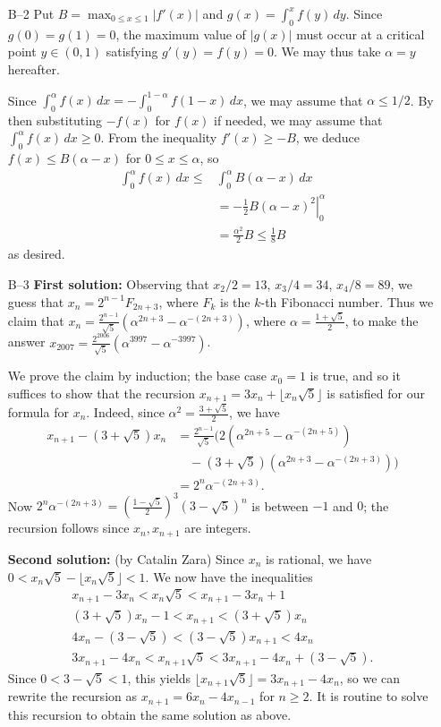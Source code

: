 \documentclass[amssymb,twocolumn,pra,10pt,aps]{revtex4-1}
\begin{document}
\begin{itemize}
\item[B--2]
Put $B = \max_{0 \leq x \leq 1} |f'(x)|$
and $g(x) = \int_0^x f(y)\,dy$. Since $g(0) = g(1) = 0$, the maximum value
of $|g(x)|$ must occur at a critical point $y \in (0,1)$ satisfying
$g'(y) = f(y) = 0$. We may thus take $\alpha = y$ hereafter.

Since $\int_0^\alpha f(x)\,dx = -\int_0^{1-\alpha} f(1-x)\,dx$,
we may assume that $\alpha \leq 1/2$. By then substituting $-f(x)$
for $f(x)$ if needed, we may assume that $\int_0^\alpha f(x)\,dx \geq 0$.
{}From the inequality $f'(x) \geq -B$, we deduce
$f(x) \leq B(\alpha - x)$ for $0 \leq x \leq \alpha$, so
\begin{align*}
\int_0^\alpha f(x)\,dx \leq &\int_0^\alpha B(\alpha-x)\,dx \\
&= -\left. \frac{1}{2} B (\alpha - x)^2 \right|_0^\alpha \\
&= \frac{\alpha^2}{2} B \leq \frac{1}{8} B
\end{align*}
as desired.

\item[B--3]
\textbf{First solution:}
Observing that $x_2/2 = 13$, $x_3/4=34$, $x_4/8=89$, we
guess that $x_n = 2^{n-1} F_{2n+3}$, where $F_k$ is the $k$-th
Fibonacci number. Thus we claim that $x_n = \frac{2^{n-1}}{\sqrt{5}}
(\alpha^{2n+3}-\alpha^{-(2n+3)})$, where $\alpha =
\frac{1+\sqrt{5}}{2}$, to make the answer $x_{2007} =
\frac{2^{2006}}{\sqrt{5}}(\alpha^{3997}-\alpha^{-3997})$.

We prove the claim by induction; the base case $x_0 = 1$ is true, and
so it suffices to show that the recursion $x_{n+1} = 3x_n + \lfloor
x_n \sqrt{5} \rfloor$ is satisfied for our formula for $x_n$. Indeed,
since $\alpha^2 = \frac{3+\sqrt{5}}{2}$, we have
\begin{align*}
x_{n+1}-(3+\sqrt{5})x_n &= \frac{2^{n-1}}{\sqrt{5}}
(2(\alpha^{2n+5}-\alpha^{-(2n+5)}) \\
&\quad-(3+\sqrt{5})(\alpha^{2n+3}-\alpha^{-(2n+3)})) \\
&= 2^n \alpha^{-(2n+3)}.
\end{align*}
Now $2^n \alpha^{-(2n+3)} =
(\frac{1-\sqrt{5}}{2})^3 (3-\sqrt{5})^n$ is between $-1$ and $0$; the
recursion follows since $x_n,x_{n+1}$ are integers.

\textbf{Second solution:}
(by Catalin Zara)
Since $x_n$ is rational, we have $0 < x_n \sqrt{5} - \lfloor x_n \sqrt{5}
\rfloor < 1$. We now have the inequalities
\begin{gather*}
x_{n+1}-3x_n < x_n \sqrt{5} < x_{n+1} -3x_n+1 \\
(3+\sqrt{5})x_n - 1 < x_{n+1} < (3+\sqrt{5})x_n \\
4x_n - (3-\sqrt{5}) < (3-\sqrt{5})x_{n+1} < 4x_n \\
3x_{n+1} - 4x_n < x_{n+1} \sqrt{5} < 3x_{n+1}-4x_n + (3-\sqrt{5}).
\end{gather*}
Since $0 < 3-\sqrt{5} < 1$, this yields $\lfloor x_{n+1} \sqrt{5}
\rfloor = 3x_{n+1} - 4x_n$, so we can rewrite the recursion as
$x_{n+1} = 6x_n - 4x_{n-1}$ for $n \geq 2$. It is routine to solve
this recursion to obtain the same solution as above.


\end{itemize}
\end{document}
